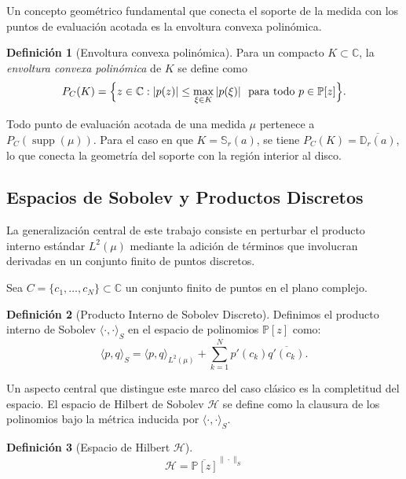 \documentclass[12pt,a4paper]{article}
\theoremstyle{definition}
\newtheorem{definition}{Definición}
\theoremstyle{remark}
\newcommand{\Poly}{\mathbb{P}[z]}
\begin{document}
Un concepto geométrico fundamental que conecta el soporte de la medida con los puntos de evaluación acotada es la envoltura convexa polinómica.

\begin{definition}[Envoltura convexa polinómica]\label{def:envoltura_polinomica}
  Para un compacto $K \subset \mathbb{C}$, la \emph{envoltura convexa polinómica} de $K$ se define como
  \[
    P_C(K) = \Bigl\{ z \in \mathbb{C} : |p(z)| \leq \max_{\xi \in K} |p(\xi)|\ \text{ para todo } p \in \Poly \Bigr\}.
  \]
\end{definition}

Todo punto de evaluación acotada de una medida $\mu$ pertenece a $P_C(\operatorname{supp}(\mu))$. Para el caso en que $K = \mathbb{S}_r(a)$, se tiene $P_C(K) = \overline{\mathbb{D}_r(a)}$, lo que conecta la geometría del soporte con la región interior al disco.

\subsection{Espacios de Sobolev y Productos Discretos}

La generalización central de este trabajo consiste en perturbar el producto interno estándar $L^2(\mu)$ mediante la adición de términos que involucran derivadas en un conjunto finito de puntos discretos.

Sea $C = \{c_1, \dots, c_N\} \subset \mathbb{C}$ un conjunto finito de puntos en el plano complejo.

\begin{definition}[Producto Interno de Sobolev Discreto]
  Definimos el producto interno de Sobolev $\langle \cdot, \cdot \rangle_S$ en el espacio de polinomios $\Poly$ como:
  \begin{equation} \label{eq:sobolev_inner_prod}
    \langle p, q \rangle_S = \langle p, q \rangle_{L^2(\mu)} + \sum_{k=1}^N p'(c_k) \overline{q'(c_k)}.
  \end{equation}
\end{definition}

Un aspecto central que distingue este marco del caso clásico es la completitud del espacio. El espacio de Hilbert de Sobolev $\mathcal{H}$ se define como la clausura de los polinomios bajo la métrica inducida por $\langle \cdot, \cdot \rangle_S$.

\begin{definition}[Espacio de Hilbert $\mathcal{H}$]
  \begin{equation}
    \mathcal{H} = \overline{\Poly}^{\|\cdot\|_S}
  \end{equation}
\end{definition}
\end{document}
